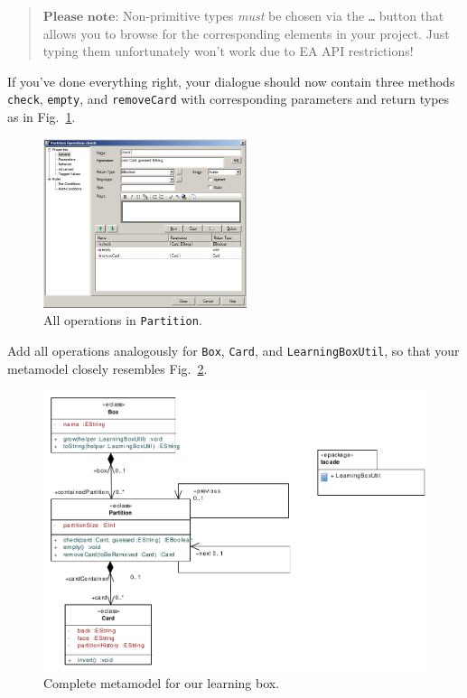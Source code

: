 \vspace{-.5cm}
\begin{quote}
$\textbf{Please note:}$ Non-primitive types \emph{must} be chosen via the
\texttt{\ldots} button that allows you to browse for the corresponding elements in your
project.  Just typing them unfortunately won't work due to EA API restrictions!
\end{quote}
\vspace{-.5cm}

If you've done everything right, your dialogue should
now contain three methods \texttt{check}, \texttt{empty}, and
\texttt{removeCard} with corresponding parameters and return types as in
Fig.~\ref{fig:operation_partition}.
\begin{figure}[htbp]
	\centering
  \includegraphics[width=0.53\textwidth]{pics/memBoxBilder/memBox39}
	\caption{All operations in \texttt{Partition}.}
	\label{fig:operation_partition}
\end{figure}

Add all operations analogously for \texttt{Box}, \texttt{Card}, and
\texttt{LearningBoxUtil}, so that your metamodel closely resembles
Fig.~\ref{fig:metamodel_complete}. 
 
\begin{figure}[htbp]
	\centering 
  \includegraphics[width=\textwidth]{pics/memBoxBilder/memBox44} 
	\caption{Complete metamodel for our learning box.}
	\label{fig:metamodel_complete}
\end{figure}

